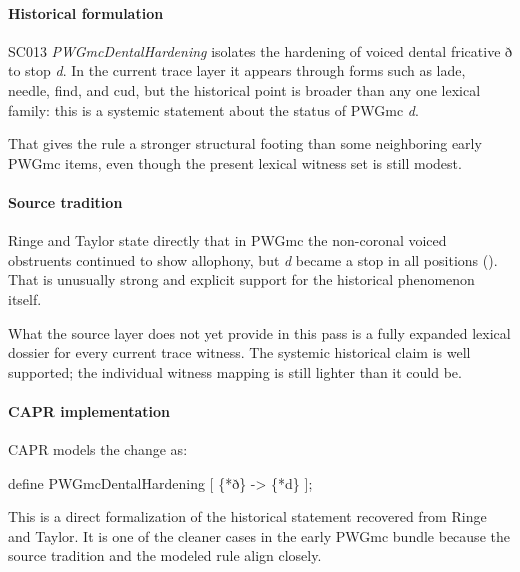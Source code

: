 \documentclass[
  british,
  a4paper,
]{article}
\newenvironment{Shaded}{}{}
\newcommand{\NormalTok}[1]{#1}
\begin{document}
\paragraph{Historical formulation}\label{historical-formulation-10}

SC013 \emph{PWGmcDentalHardening} isolates the hardening of voiced
dental fricative ð to stop \emph{d}. In the current trace layer it
appears through forms such as lade, needle, find, and cud, but the
historical point is broader than any one lexical family: this is a
systemic statement about the status of PWGmc \emph{d}.

That gives the rule a stronger structural footing than some neighboring
early PWGmc items, even though the present lexical witness set is still
modest.

\paragraph{Source tradition}\label{source-tradition-10}

Ringe and Taylor state directly that in PWGmc the non-coronal voiced
obstruents continued to show allophony, but \emph{d} became a stop in
all positions (). That is unusually strong and explicit support for the historical
phenomenon itself.

What the source layer does not yet provide in this pass is a fully
expanded lexical dossier for every current trace witness. The systemic
historical claim is well supported; the individual witness mapping is
still lighter than it could be.

\paragraph{CAPR implementation}\label{capr-implementation-10}

CAPR models the change as:

\begin{Shaded}
\begin{Highlighting}[]
\NormalTok{define PWGmcDentalHardening [}
\NormalTok{    \{*ð\} {-}\textgreater{} \{*d\}}
\NormalTok{];}
\end{Highlighting}
\end{Shaded}

This is a direct formalization of the historical statement recovered
from Ringe and Taylor. It is one of the cleaner cases in the early PWGmc
bundle because the source tradition and the modeled rule align closely.
\end{document}
